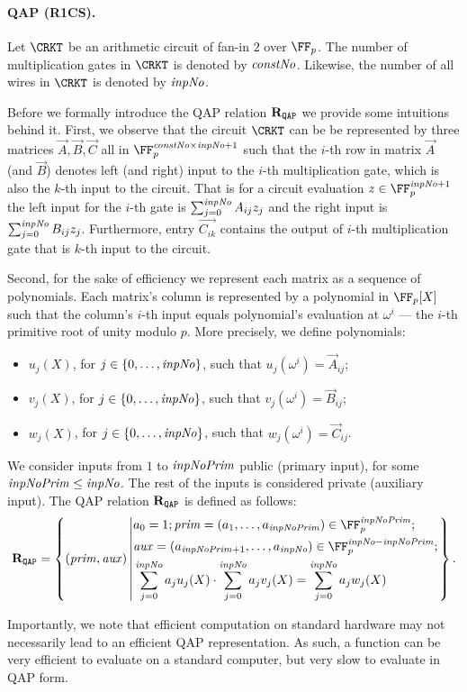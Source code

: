 \paragraph{QAP (R1CS).}
Let $\CRKT$ be an arithmetic circuit of fan-in $2$ over $\FFx{p}$.
The number of multiplication gates in $\CRKT$ is denoted by $\mathit{constNo}$. Likewise, the number of all wires in $\CRKT$ is denoted by $\mathit{inpNo}$.

Before we formally introduce the QAP relation $\mathbf{R}_{\texttt{QAP}}$ we provide some intuitions behind it.
First, we observe that the circuit $\CRKT$ can be be represented by three matrices $\vec{A}, \vec{B}, \vec{C}$ all in $\FFx{p}^{\constno \times \inpno + 1}$ such that
the $i$-th row in matrix $\vec{A}$ (and $\vec{B}$) denotes left (and right) input to the $i$-th multiplication gate, which is also the $k$-th input to the circuit. That is for a circuit evaluation $z \in \FFx{p}^{\inpno + 1}$ the left input for the $i$-th gate is $\sum_{j = 0}^{\mathit{inpNo}} A_{i j} z_{j}$ and the right input is $\sum_{j = 0}^{\mathit{inpNo}} B_{i j} z_{j}$.
Furthermore, entry $\vec{C_{i k}}$ contains the output of $i$-th multiplication gate that is $k$-th input to the circuit.

Second, for the sake of efficiency we represent each matrix as a sequence of polynomials. Each matrix's column is represented by a polynomial in $\FFx{p}[X]$ such that the column's $i$-th input equals polynomial's evaluation at $\omega^{i}$ --- the $i$-th primitive root of unity modulo $p$. More precisely, we define polynomials:
\begin{itemize}
  \item $u_j (X)$, for $j \in \{{0},\ldots,{\mathit{inpNo}}\}$, such that $u_j (\omega^{i}) = \vec{A}_{i j}$;
  \item $v_j (X)$, for $j \in \{{0},\ldots,{\mathit{inpNo}}\}$, such that $v_j (\omega^{i}) = \vec{B}_{i j}$;
  \item $w_j (X)$, for $j \in \{{0},\ldots,{\mathit{inpNo}}\}$, such that $w_j (\omega^{i}) = \vec{C}_{i j}$.
\end{itemize}

We consider inputs from $1$ to $\mathit{inpNoPrim}$ public (primary input), for some $\mathit{inpNoPrim} \leq \mathit{inpNo}$. The rest of the inputs is considered private (auxiliary input). The QAP relation $\mathbf{R}_{\texttt{QAP}}$ is defined as follows:
\[
\RELQAP = \left\{ (\priminputs, \auxinputs) \left\vert
    \begin{aligned}
    & a_0 = 1; \priminputs = (a_1, \ldots, a_\inpnoprim) \in \FFx{p}^{\inpnoprim};\\
    &\auxinputs = (a_{\inpnoprim + 1}, \ldots, a_{\inpno}) \in \FFx{p}^{\inpno - \inpnoprim};\\
    & \sum_{j = 0}^{\inpno} a_j u_j (X) \cdot \sum_{j = 0}^{\inpno} a_j v_j (X) =
    \sum_{j = 0}^{\inpno} a_j w_j (X)
    \end{aligned}
    \right.
\right\}.
\]

\begin{notebox}
    Importantly, we note that efficient computation on standard hardware may not necessarily lead to an efficient QAP representation. As such, a function can be very efficient to evaluate on a standard computer, but very slow to evaluate in QAP form.
\end{notebox}
